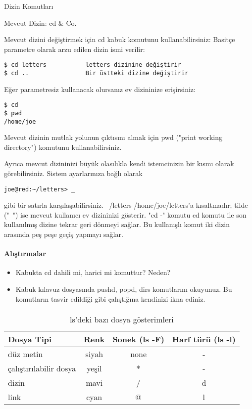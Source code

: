 \documentclass[10pt,a5paper]{book}
\begin{document}
\begin{section}{Dizin Komutları}
\begin{subsection}{Mevcut Dizin: cd \& Co.}

Mevcut dizini değiştirmek için cd kabuk komutunu kullanabilirsiniz: Basitçe parametre olarak arzu edilen dizin ismi verilir:
\begin{verbatim}
$ cd letters 	       letters dizinine değiştirir
$ cd .. 			   Bir üstteki dizine değiştirir
\end{verbatim}

Eğer parametresiz kullanacak olursanız ev dizininize erişirsiniz:

\begin{verbatim}
$ cd
$ pwd
/home/joe
\end{verbatim}

Mevcut dizinin mutlak yolunun çıktısını almak için pwd ("print working directory") komutunu kullanabilirsiniz.

Ayrıca mevcut dizininizi büyük olasılıkla kendi istemcinizin bir kısmı olarak görebilirsiniz. Sistem ayarlarınıza bağlı olarak

\begin{verbatim}
joe@red:~/letters> _
\end{verbatim}

gibi bir satırla karşılaşabilirsiniz. ~/letters /home/joe/letters'a kısaltmadır; tilde ("~") ise mevcut kullanıcı ev dizininizi gösterir.
"cd -" komutu cd komutu ile son kullanılmış dizine tekrar geri dönmeyi sağlar. Bu kullanışlı komut iki dizin arasında peş peşe geçiş yapmayı sağlar.

\paragraph{Alıştırmalar}{
\begin{itemize}
 \item Kabukta cd dahili mi, harici mi komuttur? Neden?
 \item Kabuk kılavuz dosyasında pushd, popd, dirs komutlarını okuyunuz. Bu komutların tasvir edildiği gibi çalıştığına kendinizi ikna ediniz.
\end{itemize}}

\paragraph{}{
\begin {table}[H]
\caption {ls'deki bazı dosya gösterimleri} \label{tab:title} 
\begin{tabular}{l c c c}
\hline
Dosya Tipi & Renk & Sonek (ls -F) & Harf türü (ls -l) \\
\hline
düz metin 	&	siyah & none & - \\
çalıştırılabilir dosya 	&	yeşil & * & - \\
dizin 	&	mavi & / & d \\
link 	&	cyan & @ & l \\
\hline
\end{tabular}
\end {table}
}


\end{subsection}
\end{section}
\end{document}
